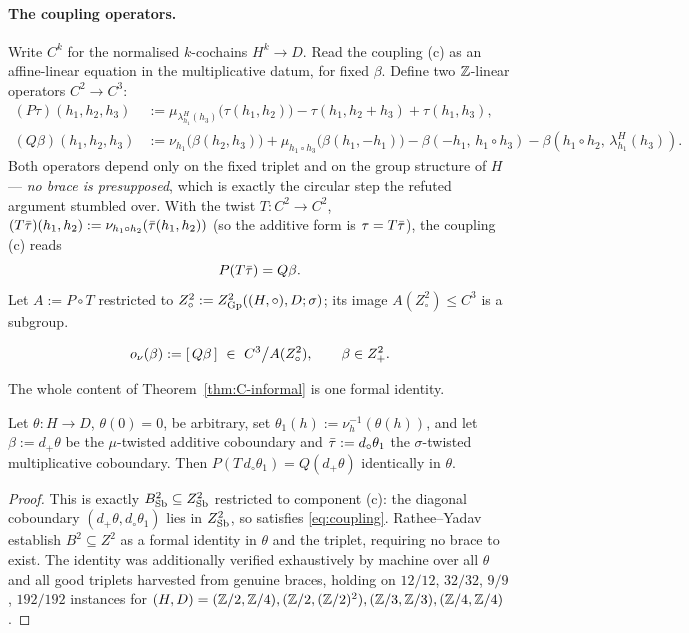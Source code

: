 \paragraph{The coupling operators.}
Write $C^k$ for the normalised $k$-cochains $H^k\to D$. Read the coupling (c) as an
affine-linear equation in the multiplicative datum, for fixed $\beta$. Define two
$\mathbb{Z}$-linear operators $C^2\to C^3$:
\begin{align}
(P\tau)(h_1,h_2,h_3)&:=\mu_{\lambda^H_{h_1}(h_3)}\!\big(\tau(h_1,h_2)\big)
-\tau(h_1,h_2{+}h_3)+\tau(h_1,h_3),\label{eq:P}\\[2pt]
(Q\beta)(h_1,h_2,h_3)&:=\nu_{h_1}\!\big(\beta(h_2,h_3)\big)
+\mu_{h_1\circ h_3}\!\big(\beta(h_1,-h_1)\big)
-\beta(-h_1,\,h_1{\circ}h_3)-\beta(h_1{\circ}h_2,\,\lambda^H_{h_1}(h_3)).\label{eq:Q}
\end{align}
Both operators depend only on the fixed triplet and on the group structure of $H$
--- \emph{no brace is presupposed}, which is exactly the circular step the refuted
argument stumbled over. With the twist $T\colon C^2\to C^2$,
$(T\bar\tau)(h_1,h_2):=\nu_{h_1\circ h_2}(\bar\tau(h_1,h_2))$ (so the additive form is
$\tau=T\bar\tau$), the coupling (c) reads
\begin{equation}\label{eq:coupling}
P(T\bar\tau)=Q\beta .
\end{equation}
Let $A:=P\circ T$ restricted to $Z^2_\circ:=Z^2_{\mathrm{Gp}}((H,\circ),D;\sigma)$; its
image $A(Z^2_\circ)\le C^3$ is a subgroup.

\begin{definition}\label{def:onu}
\[
   \onu(\beta):=[\,Q\beta\,]\ \in\ C^3\big/A(Z^2_\circ),\qquad \beta\in Z^2_+ .
\]
\end{definition}

The whole content of Theorem~\ref{thm:C-informal} is one formal identity.

\begin{lemma}
\label{lem:linchpin}
Let $\theta\colon H\to D$, $\theta(0)=0$, be arbitrary, set
$\theta_1(h):=\nu_h^{-1}(\theta(h))$, and let $\beta:=d_+\theta$ be the
$\mu$-twisted additive coboundary and $\bar\tau:=d_\circ\theta_1$ the
$\sigma$-twisted multiplicative coboundary. Then $P(T\,d_\circ\theta_1)=Q(d_+\theta)$
identically in $\theta$.
\end{lemma}

\begin{proof}
This is exactly $B^2_{\mathrm{Sb}}\subseteq Z^2_{\mathrm{Sb}}$ restricted to component (c): the diagonal
coboundary $(d_+\theta,d_\circ\theta_1)$ lies in $Z^2_{\mathrm{Sb}}$, so satisfies
\eqref{eq:coupling}. Rathee--Yadav establish $B^2\subseteq Z^2$ as a formal
identity in $\theta$ and the triplet, requiring no brace to exist. The identity was
additionally verified exhaustively by machine over all $\theta$ and all good
triplets harvested from genuine braces, holding on $12/12$, $32/32$, $9/9$,
$192/192$ instances for $(H,D)=(\mathbb{Z}/2,\mathbb{Z}/4),(\mathbb{Z}/2,(\mathbb{Z}/2)^2),(\mathbb{Z}/3,\mathbb{Z}/3),(\mathbb{Z}/4,\mathbb{Z}/4)$.
\end{proof}

